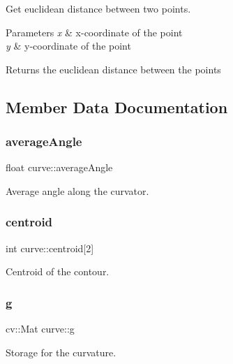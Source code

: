 Get euclidean distance between two points. 


\begin{DoxyParams}{Parameters}
{\em x} & x-\/coordinate of the point \\
\hline
{\em y} & y-\/coordinate of the point \\
\hline
\end{DoxyParams}
\begin{DoxyReturn}{Returns}
the euclidean distance between the points 
\end{DoxyReturn}


\subsection{Member Data Documentation}
\hypertarget{structcurve_a67806447783717dcb334f0e6c8dd0093}{}\label{structcurve_a67806447783717dcb334f0e6c8dd0093} 
\subsubsection{\texorpdfstring{average\+Angle}{averageAngle}}
{\footnotesize\ttfamily float curve\+::average\+Angle}



Average angle along the curvator. 

\hypertarget{structcurve_a434421bfdc9c8961a28590ef99f83e00}{}\label{structcurve_a434421bfdc9c8961a28590ef99f83e00} 
\subsubsection{\texorpdfstring{centroid}{centroid}}
{\footnotesize\ttfamily int curve\+::centroid\mbox{[}2\mbox{]}}



Centroid of the contour. 

\hypertarget{structcurve_afb7fe75fc30f7a832dbb845db62a5244}{}\label{structcurve_afb7fe75fc30f7a832dbb845db62a5244} 
\subsubsection{\texorpdfstring{g}{g}}
{\footnotesize\ttfamily cv\+::\+Mat curve\+::g}



Storage for the curvature. 

